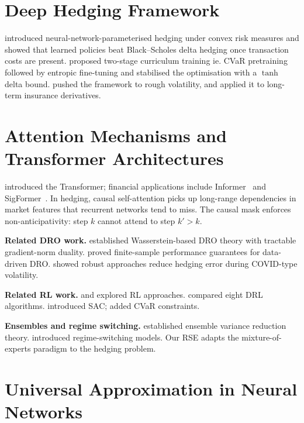 \documentclass[11pt,oneside]{report}
\begin{document}
\section{Deep Hedging Framework}

\citet{buehler2019deep} introduced neural-network-parameterised hedging under convex risk measures and showed that learned policies beat Black--Scholes delta hedging once transaction costs are present. \citet{kozyra2019deep} proposed two-stage curriculum training ie. CVaR pretraining followed by entropic fine-tuning and stabilised the optimisation with a $\tanh$ delta bound. \citet{horvath2021deep} pushed the framework to rough volatility, and \citet{carbonneau2021deep} applied it to long-term insurance derivatives.



\section{Attention Mechanisms and Transformer Architectures}

\citet{vaswani2017attention} introduced the Transformer; financial applications include Informer~\citep{zhou2021informer} and SigFormer~\citep{tong2023sigformer}. In hedging, causal self-attention picks up long-range dependencies in market features that recurrent networks tend to miss. The causal mask enforces non-anticipativity: step $k$ cannot attend to step $k'>k$.

\textbf{Related DRO work.} \citet{blanchet2019quantifying} established Wasserstein-based DRO theory with tractable gradient-norm duality. \citet{esfahani2018data} proved finite-sample performance guarantees for data-driven DRO. \citet{lutkebohmert2019robust} showed robust approaches reduce hedging error during COVID-type volatility.

\textbf{Related RL work.} \citet{kolm2019dynamic} and \citet{cao2021deep} explored RL approaches. \citet{neagu2025drl} compared eight DRL algorithms. \citet{haarnoja2018soft} introduced SAC; \citet{huang2025sac} added CVaR constraints.

\textbf{Ensembles and regime switching.} \citet{dietterich2000ensemble} established ensemble variance reduction theory. \citet{hamilton1989new} introduced regime-switching models. Our RSE adapts the mixture-of-experts paradigm to the hedging problem.

\section{Universal Approximation in Neural Networks}
\end{document}
